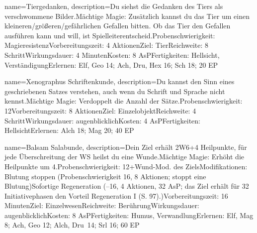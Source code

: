 {
    name={Tiergedanken},
    description={Du siehst die Gedanken des Tiers als verschwommene Bilder.\newline Mächtige Magie: Zusätzlich kannst du das Tier um einen kleineren/größeren/gefährlichen Gefallen bitten. Ob das Tier den Gefallen ausführen kann und will, ist Spielleiterentscheid.\newline Probenschwierigkeit: Magieresistenz\newline Vorbereitungszeit: 4 Aktionen\newline Ziel: Tier\newline Reichweite: 8 Schritt\newline Wirkungsdauer: 4 Minuten\newline Kosten: 8 AsP\newline Fertigkeiten: Hellsicht, Verständigung\newline Erlernen: Elf, Geo 14; Ach, Dru, Hex 16; Sch 18; 20 EP}
}


{
    name={Xenographus Schriftenkunde},
    description={Du kannst den Sinn eines geschriebenen Satzes verstehen, auch wenn du Schrift und Sprache nicht kennst.\newline Mächtige Magie: Verdoppelt die Anzahl der Sätze.\newline Probenschwierigkeit: 12\newline Vorbereitungszeit: 8 Aktionen\newline Ziel: Einzelobjekt\newline Reichweite: 4 Schritt\newline Wirkungsdauer: augenblicklich\newline Kosten: 4 AsP\newline Fertigkeiten: Hellsicht\newline Erlernen: Alch 18; Mag 20; 40 EP}
}


{
    name={Balsam Salabunde},
    description={Dein Ziel erhält 2W6+4 Heilpunkte, für jede Überschreitung der WS heilst du eine Wunde.\newline Mächtige Magie: Erhöht die Heilpunkte um 4.\newline Probenschwierigkeit: 12+Wund-Mod. des Ziels\newline Modifikationen: Blutung stoppen (Probenschwierigkeit 16, 8 Aktionen; stoppt eine Blutung)\newline Sofortige Regeneration (–16, 4 Aktionen, 32 AsP; das Ziel erhält für 32 Initiativephasen den Vorteil Regeneration I (S. 97).)\newline Vorbereitungszeit: 16 Minuten\newline Ziel: Einzelwesen\newline Reichweite: Berührung\newline Wirkungsdauer: augenblicklich\newline Kosten: 8 AsP\newline Fertigkeiten: Humus, Verwandlung\newline Erlernen: Elf, Mag 8; Ach, Geo 12; Alch, Dru 14; Srl 16; 60 EP}
}


